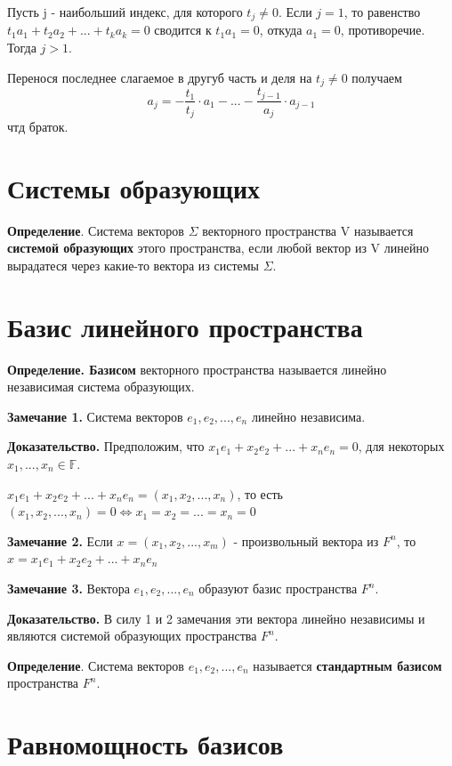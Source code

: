 \documentclass[a4paper]{article}
\begin{document}
{\begin{small}
Пусть j - наибольший индекс, для которого $t_j \neq 0$. Если $j=1$, то равенство  $t_1a_1 + t_2a_2 + ... + t_ka_k = 0$ сводится к $t_1a_1 = 0$, откуда $a_1 = 0$, противоречие. Тогда $j>1$.

Перенося последнее слагаемое в другуб часть и деля на $t_j \neq 0$ получаем \begin{equation}
\displaystyle a_j = -\frac{t_1}{t_j}\cdot a_1 - ... - \frac{t_{j-1}}{a_j} \cdot a_{j-1}
\end{equation}
чтд браток.

\section*{Системы образующих}
\textbf{Определение}. Система векторов $\Sigma$ векторного пространства V называется \textbf{системой образующих} этого пространства, если любой вектор из V линейно вырадатеся через какие-то вектора из системы $\Sigma$.

\section*{Базис линейного пространства}
\textbf{Определение. Базисом} векторного пространства называется линейно независимая
система образующих.


\textbf{Замечание 1.} Система векторов $e_1, e_2, ..., e_n$ линейно независима.

\textbf{Доказательство.} Предположим, что $x_1e_1+x_2e_2 + ... + x_ne_n = 0$, для некоторых $x_1, ..., x_n \in \mathbb{F}$. 

$x_1e_1+x_2e_2 + ... + x_ne_n = (x_1, x_2, ..., x_n)$, то есть $(x_1, x_2, ..., x_n) = 0 \Leftrightarrow x_1 = x_2 = ... = x_n = 0$

\textbf{Замечание 2.} Если $x = (x_1, x_2, ..., x_m) $ - произвольный вектора из $F^n$, то $x = x_1e_1 + x_2e_2 + ... + x_ne_n$

\textbf{Замечание 3.} Вектора $e_1, e_2, ..., e_n$ образуют базис пространства $F^n$.

\textbf{Доказательство.} В силу 1 и 2 замечания эти вектора линейно независимы и являются системой образующих пространства $F^n$.

\textbf{Определение}. Система векторов $e_1, e_2, ..., e_n$ называется \textbf{стандартным базисом} пространства $F^n$.

\section*{Равномощность базисов}


\end{small}}
\end{document}
